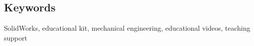 \documentclass{template/socthesis}
\begin{document}
\subsection*{Keywords}
SolidWorks, educational kit, mechanical engineering, educational videos, teaching support

\newpage
\pagestyle{plain}

\setlength{\parskip}{0em}
\tableofcontents %

\setlength{\parskip}{0.8em}
\setcounter{figure}{0}
\setcounter{table}{0}
\newpage







\newpage

\appendix
{}



\setlength{\parskip}{0em}
\printbibliography[title=Literatura]

\listoffigures \label{listoffigures}

\end{document}
